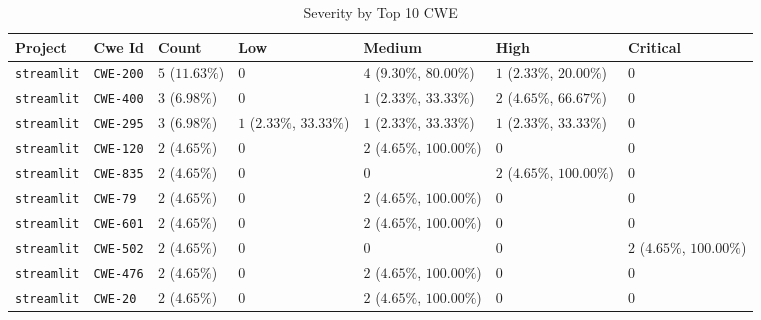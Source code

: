 \begin{table}
\caption{Severity by Top 10 CWE}
\label{tab:cwe-distribution}
\begin{tabular}{lllllll}
\toprule
Project & Cwe Id & Count & Low & Medium & High & Critical \\
\midrule
\texttt{streamlit} & \texttt{CWE-200} & $5$ ($11.63\%$) & $0$ & $4$ ($9.30\%$, $80.00\%$) & $1$ ($2.33\%$, $20.00\%$) & $0$ \\
\texttt{streamlit} & \texttt{CWE-400} & $3$ ($6.98\%$) & $0$ & $1$ ($2.33\%$, $33.33\%$) & $2$ ($4.65\%$, $66.67\%$) & $0$ \\
\texttt{streamlit} & \texttt{CWE-295} & $3$ ($6.98\%$) & $1$ ($2.33\%$, $33.33\%$) & $1$ ($2.33\%$, $33.33\%$) & $1$ ($2.33\%$, $33.33\%$) & $0$ \\
\texttt{streamlit} & \texttt{CWE-120} & $2$ ($4.65\%$) & $0$ & $2$ ($4.65\%$, $100.00\%$) & $0$ & $0$ \\
\texttt{streamlit} & \texttt{CWE-835} & $2$ ($4.65\%$) & $0$ & $0$ & $2$ ($4.65\%$, $100.00\%$) & $0$ \\
\texttt{streamlit} & \texttt{CWE-79} & $2$ ($4.65\%$) & $0$ & $2$ ($4.65\%$, $100.00\%$) & $0$ & $0$ \\
\texttt{streamlit} & \texttt{CWE-601} & $2$ ($4.65\%$) & $0$ & $2$ ($4.65\%$, $100.00\%$) & $0$ & $0$ \\
\texttt{streamlit} & \texttt{CWE-502} & $2$ ($4.65\%$) & $0$ & $0$ & $0$ & $2$ ($4.65\%$, $100.00\%$) \\
\texttt{streamlit} & \texttt{CWE-476} & $2$ ($4.65\%$) & $0$ & $2$ ($4.65\%$, $100.00\%$) & $0$ & $0$ \\
\texttt{streamlit} & \texttt{CWE-20} & $2$ ($4.65\%$) & $0$ & $2$ ($4.65\%$, $100.00\%$) & $0$ & $0$ \\
\bottomrule
\end{tabular}
\end{table}
